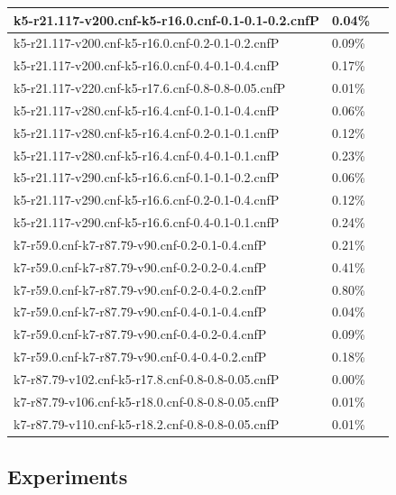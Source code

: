 \documentclass[12pt,a4paper,twoside]{scrartcl}
\numberwithin{equation}{section}
\begin{document}
\begin{table}[H]
\begin{center}
\begin{tabular}{|l|l|p{1cm}|}
 k5-r21.117-v200.cnf-k5-r16.0.cnf-0.1-0.1-0.2.cnfP&	0.04\%	\\   \hline
 k5-r21.117-v200.cnf-k5-r16.0.cnf-0.2-0.1-0.2.cnfP&	0.09\%	\\   \hline
 k5-r21.117-v200.cnf-k5-r16.0.cnf-0.4-0.1-0.4.cnfP&	0.17\%	\\   \hline
 k5-r21.117-v220.cnf-k5-r17.6.cnf-0.8-0.8-0.05.cnfP&	0.01\%	\\   \hline
 k5-r21.117-v280.cnf-k5-r16.4.cnf-0.1-0.1-0.4.cnfP&	0.06\%	\\   \hline
 k5-r21.117-v280.cnf-k5-r16.4.cnf-0.2-0.1-0.1.cnfP&	0.12\%	\\   \hline
 k5-r21.117-v280.cnf-k5-r16.4.cnf-0.4-0.1-0.1.cnfP&	0.23\%	\\   \hline
 k5-r21.117-v290.cnf-k5-r16.6.cnf-0.1-0.1-0.2.cnfP&	0.06\%	\\   \hline
 k5-r21.117-v290.cnf-k5-r16.6.cnf-0.2-0.1-0.4.cnfP&	0.12\%	\\   \hline
 k5-r21.117-v290.cnf-k5-r16.6.cnf-0.4-0.1-0.1.cnfP&	0.24\%	\\   \hline
 k7-r59.0.cnf-k7-r87.79-v90.cnf-0.2-0.1-0.4.cnfP&	0.21\%	\\   \hline
 k7-r59.0.cnf-k7-r87.79-v90.cnf-0.2-0.2-0.4.cnfP&	0.41\%	\\   \hline
 k7-r59.0.cnf-k7-r87.79-v90.cnf-0.2-0.4-0.2.cnfP&	0.80\%	\\   \hline
 k7-r59.0.cnf-k7-r87.79-v90.cnf-0.4-0.1-0.4.cnfP&	0.04\%	\\   \hline
 k7-r59.0.cnf-k7-r87.79-v90.cnf-0.4-0.2-0.4.cnfP&	0.09\%	\\   \hline
 k7-r59.0.cnf-k7-r87.79-v90.cnf-0.4-0.4-0.2.cnfP&	0.18\%	\\   \hline
 k7-r87.79-v102.cnf-k5-r17.8.cnf-0.8-0.8-0.05.cnfP&	0.00\%	\\   \hline
 k7-r87.79-v106.cnf-k5-r18.0.cnf-0.8-0.8-0.05.cnfP&	0.01\%	\\   \hline
 k7-r87.79-v110.cnf-k5-r18.2.cnf-0.8-0.8-0.05.cnfP&	0.01\%	\\   \hline

\end{tabular}
\end{center}
\end{table} 

\subsection{Experiments}
\end{document}
